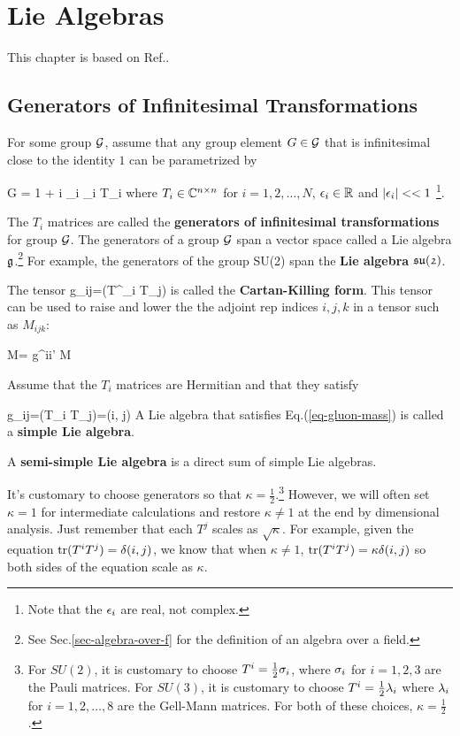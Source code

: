 \chapter{Lie Algebras}
\label{ch-lie-alg}

This chapter is based on 
Ref.\cite{birdtracks-book}.
\section{Generators of Infinitesimal Transformations}

For some group
${\cal G}$, assume that any group element $G\in{\cal G}$
that is infinitesimal 
close to the identity
$1$ can be parametrized by


\beq
G = 1 + i \sum_i 
\eps_i T_i
\eeq
where $T_i\in { \mathbb{C}}^{n\times n}$
for $i=1,2, \ldots, N$,
$\epsilon_i\in{ \mathbb{R}} $
and $|\epsilon_i|<<1$
\footnote{Note that the $\epsilon_i$ are real, not complex.}.

The $T_i$ matrices are called
the {\bf generators
of infinitesimal transformations}
for group ${\cal G}$.
The generators of a group ${\cal G}$ span a vector space 
called a Lie algebra $\mathfrak{g}$.\footnote{See Sec.\ref{sec-algebra-over-f}
for the definition of an algebra over a field.
} For example,
the generators of the group SU(2) 
span the {\bf Lie algebra} $\mathfrak{su(2)}$.

The tensor
\beq
g_{ij}=\tr(T^\dagger_i T_j)
\eeq
is called the {\bf Cartan-Killing form}. This tensor  can
be used to raise and lower the 
the adjoint rep indices $i, j, k$
in a tensor such as $M_{ijk}$:


\beq
M=
g^{ii'}
M
\eeq


Assume that the $T_i$ matrices are Hermitian and
that they satisfy

\beq
g_{ij}=\tr(T_i T_j)=\kappa\delta(i, j)
\label{eq-gluon-mass}
\eeq
A Lie algebra that satisfies Eq.(\ref{eq-gluon-mass})
is called a {\bf simple Lie algebra}. 

A {\bf semi-simple Lie algebra} is a direct
sum of simple Lie algebras.


It's customary to choose 
generators so that  $\kappa=\frac{1}{2}$.\footnote{For $SU(2)$,
it is customary to
choose $T^i =\frac{1}{2}\sigma_i$,
where $\sigma_i$ for $i=1,2,3$ are the Pauli matrices.
For $SU(3)$,
it is customary to choose $T^i=
\frac{1}{2}\lambda_i$
where $\lambda_i$
for $i=1,2, \ldots, 8$ are the Gell-Mann matrices.
For both of these choices,
$\kappa=\frac{1}{2}$.}
However, we will often set $\kappa=1$
for intermediate calculations
and restore $\kappa\neq 1$ at the end by dimensional analysis.
Just remember that each $T^j$ scales as $\sqrt{\kappa}$.
For example, given
the equation 
${\rm tr }(T^iT^j)=\delta(i,j)$,
we know that when $\kappa\neq 1$,
${\rm tr }(T^iT^j)=\kappa\delta(i,j)$
so both sides of the equation scale as $\kappa$.


